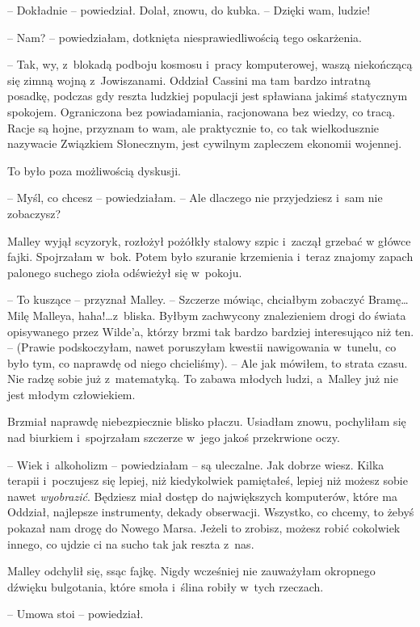 \documentclass[oneside,polish,11pt,sfheadings]{mwbk}
\begin{document}
-- Dokładnie -- powiedział. Dolał, znowu, do kubka. -- Dzięki wam, ludzie!

-- Nam? -- powiedziałam, dotknięta niesprawiedliwością tego oskarżenia.

-- Tak, wy, z~blokadą podboju kosmosu i~pracy komputerowej, waszą
niekończącą się zimną wojną z~Jowiszanami. Oddział Cassini ma tam bardzo
intratną posadkę, podczas gdy reszta ludzkiej populacji jest spławiana
jakimś statycznym spokojem. Ograniczona bez powiadamiania, racjonowana
bez wiedzy, co tracą. Racje są hojne, przyznam to wam, ale praktycznie
to, co tak wielkodusznie nazywacie Związkiem Słonecznym, jest cywilnym
zapleczem ekonomii wojennej.

To było poza możliwością dyskusji.

-- Myśl, co chcesz -- powiedziałam. -- Ale dlaczego nie przyjedziesz i~sam
nie zobaczysz?

Malley wyjął scyzoryk, rozłożył pożółkły stalowy szpic i~zaczął grzebać
w główce fajki. Spojrzałam w~bok. Potem było szuranie krzemienia i~teraz
znajomy zapach palonego suchego zioła odświeżył się w~pokoju.

-- To kuszące -- przyznał Malley. -- Szczerze mówiąc, chciałbym zobaczyć
Bramę\ldots  Milę Malleya, haha!\ldots  z~bliska. Byłbym zachwycony znalezieniem
drogi do świata opisywanego przez Wilde'a, którzy brzmi tak bardzo
bardziej interesująco niż ten. -- (Prawie podskoczyłam, nawet poruszyłam
kwestii nawigowania w~tunelu, co było tym, co naprawdę od niego
chcieliśmy). -- Ale jak mówiłem, to strata czasu. Nie radzę sobie już z~matematyką. To zabawa młodych ludzi, a~Malley już nie jest młodym
człowiekiem.

Brzmiał naprawdę niebezpiecznie blisko płaczu. Usiadłam znowu,
pochyliłam się nad biurkiem i~spojrzałam szczerze w~jego jakoś
przekrwione oczy.

-- Wiek i~alkoholizm -- powiedziałam -- są uleczalne. Jak dobrze wiesz.
Kilka terapii i~poczujesz się lepiej, niż kiedykolwiek pamiętałeś,
lepiej niż możesz sobie nawet \textit{wyobrazić}. Będziesz miał dostęp do
największych komputerów, które ma Oddział, najlepsze instrumenty, dekady
obserwacji. Wszystko, co chcemy, to żebyś pokazał nam drogę do Nowego
Marsa. Jeżeli to zrobisz, możesz robić cokolwiek innego, co ujdzie ci na
sucho tak jak reszta z~nas.

Malley odchylił się, ssąc fajkę. Nigdy wcześniej nie zauważyłam
okropnego dźwięku bulgotania, które smoła i~ślina robiły w~tych
rzeczach.

-- Umowa stoi -- powiedział.
\end{document}

